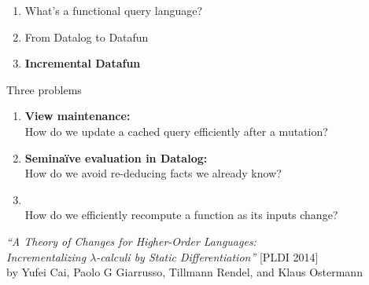 \documentclass[xcolor=table,usenames,dvipsnames,svgnames]{beamer}
\begin{document}

\begin{frame}\Large
  \begin{enumerate}\color{gray}\itemsep 1.5em
  \item What's a functional query language?
  \item From Datalog to Datafun
  \item {\color{black}\bf Incremental Datafun}
  \end{enumerate}
\end{frame}


\begin{frame}{Three problems}\large
  \begin{enumerate}\itemsep 1em
  \item {\bf View maintenance:} \\
    {\normalsize How do we update a cached query efficiently after a mutation?}\
    \pause
  \item {\bf Semina\"ive evaluation in Datalog:}\\
    {\normalsize How do we avoid re-deducing facts we already know?}
    \pause
  \item \color{black}{\bf Incremental computation:}\\
    {\normalsize How do we efficiently recompute a function as its
      inputs change?}
  \end{enumerate}
\end{frame}

\begin{frame}
  \Large {\it ``A Theory of Changes for Higher-Order Languages:\\
    Incrementalizing $\lambda$-calculi by Static Differentiation''}
  \vspace{0.1em}\newline\normalsize [PLDI 2014]
  \\\vspace{0.5em}
  \small by Yufei Cai, Paolo G Giarrusso, Tillmann Rendel, and Klaus Ostermann
\end{frame}
\end{document}
